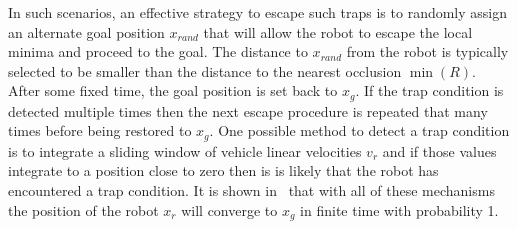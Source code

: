 In such scenarios, an effective strategy to escape such traps is to randomly assign an alternate goal position $x_{rand}$
that will allow the robot to escape the local minima and proceed to the goal. The distance to $x_{rand}$ from the robot
is typically selected to be smaller than the distance to the nearest occlusion $\min(R)$. After some fixed time, the
goal position is set back to $x_g$. If the trap condition is detected multiple times then the next escape procedure is
repeated that many times before being restored to $x_g$. One possible method to detect a trap condition is to integrate
a sliding window of vehicle linear velocities $v_r$ and if those values integrate to a position close to zero then is is likely
that the robot has encountered a trap condition. It is shown in~\cite{Krishnamurthy07} that with all of these mechanisms the position of the robot 
$x_r$ will converge to $x_g$ in finite time with probability 1.
